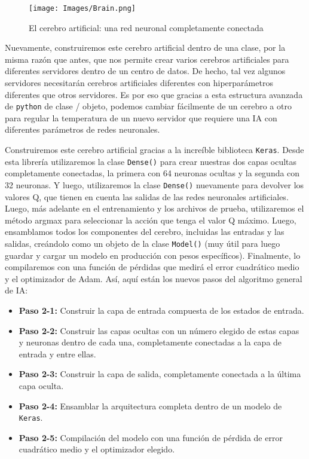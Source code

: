 \documentclass[
]{book}
\providecommand{\tightlist}{%
  \setlength{\itemsep}{0pt}\setlength{\parskip}{0pt}}
\begin{document}
\begin{figure}
\centering
\texttt{[image: Images/Brain.png]}
\caption{El cerebro artificial: una red neuronal completamente conectada}
\end{figure}

Nuevamente, construiremos este cerebro artificial dentro de una clase, por la misma razón que antes, que nos permite crear varios cerebros artificiales para diferentes servidores dentro de un centro de datos. De hecho, tal vez algunos servidores necesitarán cerebros artificiales diferentes con hiperparámetros diferentes que otros servidores. Es por eso que gracias a esta estructura avanzada de \texttt{python} de clase / objeto, podemos cambiar fácilmente de un cerebro a otro para regular la temperatura de un nuevo servidor que requiere una IA con diferentes parámetros de redes neuronales.

Construiremos este cerebro artificial gracias a la increíble biblioteca \texttt{Keras}. Desde esta librería utilizaremos la clase \texttt{Dense()} para crear nuestras dos capas ocultas completamente conectadas, la primera con 64 neuronas ocultas y la segunda con 32 neuronas. Y luego, utilizaremos la clase \texttt{Dense()} nuevamente para devolver los valores Q, que tienen en cuenta las salidas de las redes neuronales artificiales. Luego, más adelante en el entrenamiento y los archivos de prueba, utilizaremos el método argmax para seleccionar la acción que tenga el valor Q máximo. Luego, ensamblamos todos los componentes del cerebro, incluidas las entradas y las salidas, creándolo como un objeto de la clase \texttt{Model()} (muy útil para luego guardar y cargar un modelo en producción con pesos específicos). Finalmente, lo compilaremos con una función de pérdidas que medirá el error cuadrático medio y el optimizador de Adam. Así, aquí están los nuevos pasos del algoritmo general de IA:

\begin{itemize}
\tightlist
\item
  \textbf{Paso 2-1:} Construir la capa de entrada compuesta de los estados de entrada.
\item
  \textbf{Paso 2-2:} Construir las capas ocultas con un número elegido de estas capas y neuronas dentro de cada una, completamente conectadas a la capa de entrada y entre ellas.
\item
  \textbf{Paso 2-3:} Construir la capa de salida, completamente conectada a la última capa oculta.
\item
  \textbf{Paso 2-4:} Ensamblar la arquitectura completa dentro de un modelo de \texttt{Keras}.
\item
  \textbf{Paso 2-5:} Compilación del modelo con una función de pérdida de error cuadrático medio y el optimizador elegido.
\end{itemize}
\end{document}
